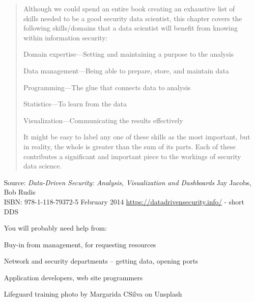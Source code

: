 \documentclass[Screen16to9,17pt]{foils}
\begin{document}

\begin{quote}
Although we could spend an entire book creating an exhaustive list of skills needed to be a good security data scientist, this chapter covers the following skills/domains that a data scientist will benefit from
knowing within information security:
\begin{list2}
\item Domain expertise—Setting and maintaining a purpose to the analysis
\item Data management—Being able to prepare, store, and maintain data
\item Programming—The glue that connects data to analysis
\item Statistics—To learn from the data
\item Visualization—Communicating the results effectively
\end{list2}
It might be easy to label any one of these skills as the most important, but in reality, the whole is greater than the sum of its parts. Each of these contributes a significant and important piece to the workings of
security data science.
\end{quote}

Source: \emph{Data-Driven Security: Analysis, Visualization and Dashboards} Jay Jacobs, Bob Rudis\\
ISBN: 978-1-118-79372-5 February 2014 \url{https://datadrivensecurity.info/} - short DDS





You will probably need help from:

\begin{list2}
\item Buy-in from management, for requesting resources
\item Network and security departments -- getting data, opening ports
\item Application developers, web site programmers
\end{list2}
Lifeguard training photo by Margarida CSilva on Unsplash




\begin{quote}

\end{quote}
\end{document}
